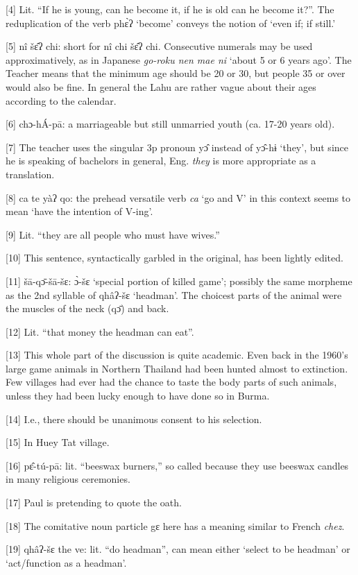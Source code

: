 {[4] Lit. ``If he is young, can he become it, if he is old can he become
it?''. The reduplication of the verb phɛ̀ʔ `become' conveys the notion of `even
if; if still.'}

{[5] nî šɛ̂ʔ chi: short for nî chi šɛ̂ʔ chi. Consecutive numerals
may be used approximatively, as in Japanese }{\textit{go-roku nen mae ni}}{
`about 5 or 6 years ago'. The Teacher means that the minimum age should be 20 or
30, but people 35 or over would also be fine. In general the Lahu are rather vague
about their ages according to the calendar.}

{[6] chɔ-hÁ-pā: a marriageable but still unmarried youth (ca. 17-20
years old). }

{[7] The teacher uses the singular 3p pronoun yɔ̂ instead of yɔ̂-hɨ
`they', but since he is speaking of bachelors in general, Eng. }{\textit{they}}{
is more appropriate as a translation.}

{[8] ca te yàʔ qo: the prehead versatile verb }{\textit{ca}}{
`go and V' in this context seems to mean `have the intention of V-ing'.}

{[9] Lit. ``they are all people who must have wives.''}

{[10] This sentence, syntactically garbled in the original, has been lightly
edited.}

{[11] šā-qɔ̄-šā-šɛ: ɔ̀-šɛ `special portion of killed game';
possibly the same morpheme as the 2nd syllable of qhâʔ-šɛ `headman'. The choicest
parts of the animal were the muscles of the neck (qɔ̄) and back.}

{[12] Lit. ``that money the headman can eat''.}

{[13] This whole part of the discussion is quite academic. Even back in
the 1960's large game animals in Northern Thailand had been hunted almost to extinction.
Few villages had ever had the chance to taste the body parts of such animals, unless
they had been lucky enough to have done so in Burma.}

{[14] I.e., there should be unanimous consent to his selection.}

{[15] In Huey Tat village.}

{[16] pɛ̂-tú-pā: lit. ``beeswax burners,'' so called because they use
beeswax candles in many religious ceremonies.}

{[17] Paul is pretending to quote the oath.}

{[18] The comitative noun particle gɛ here has a meaning similar to French
}{\textit{chez}}{.}

{[19] qhâʔ-šɛ the ve: lit. ``do headman'', can mean either `select to
be headman' or `act/function as a headman'. }

